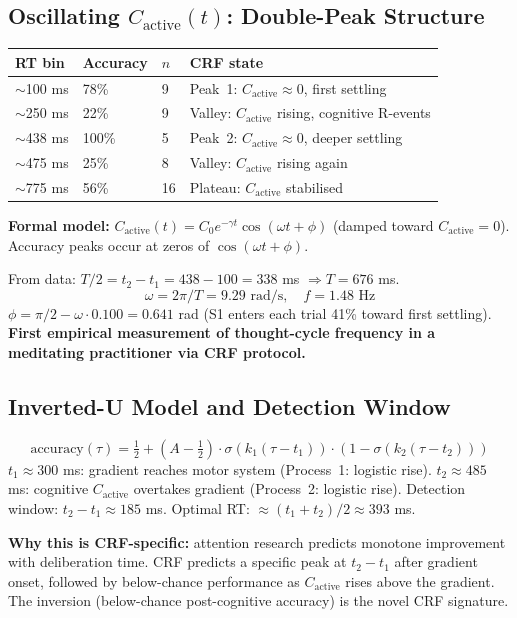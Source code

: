 \documentclass[12pt, a4paper]{article}
\begin{document}
\subsection{Oscillating $C_{\mathrm{active}}(t)$: Double-Peak Structure}

\begin{derivedbox}[title={S1: Double-Peak Structure Confirmed (v5 --- 80 Trials)}]
\begin{center}
\renewcommand{\arraystretch}{1.35}
\begin{tabular}{lllp{6cm}}
\toprule
\textbf{RT bin} & \textbf{Accuracy} & \textbf{$n$} & \textbf{CRF state} \\
\midrule
$\sim$100 ms & 78\% & 9 & Peak~1: $C_{\mathrm{active}} \approx 0$, first settling \\
$\sim$250 ms & 22\% & 9 & Valley: $C_{\mathrm{active}}$ rising, cognitive R-events \\
$\sim$438 ms & 100\% & 5 & Peak~2: $C_{\mathrm{active}} \approx 0$, deeper settling \\
$\sim$475 ms & 25\% & 8 & Valley: $C_{\mathrm{active}}$ rising again \\
$\sim$775 ms & 56\% & 16 & Plateau: $C_{\mathrm{active}}$ stabilised \\
\bottomrule
\end{tabular}
\end{center}

\textbf{Formal model:} $C_{\mathrm{active}}(t) = C_0 e^{-\gamma t}\cos(\omega t + \phi)$
(damped toward $C_{\mathrm{active}} = 0$). Accuracy peaks occur at zeros of $\cos(\omega t + \phi)$.

From data: $T/2 = t_2 - t_1 = 438 - 100 = 338$ ms $\Rightarrow T = 676$ ms.
\[
\omega = 2\pi/T = 9.29\text{ rad/s}, \quad f = 1.48\text{ Hz}
\]
$\phi = \pi/2 - \omega \cdot 0.100 = 0.641$ rad (S1 enters each trial 41\% toward first settling).
\textbf{First empirical measurement of thought-cycle frequency in a meditating practitioner
via CRF protocol.}
\end{derivedbox}

\subsection{Inverted-U Model and Detection Window}

\begin{derivedbox}[title={P0-H Formal Model: Two-Threshold Timing}]
\[
\mathrm{accuracy}(\tau) = \tfrac{1}{2} + \left(A - \tfrac{1}{2}\right)
\cdot \sigma(k_1(\tau - t_1)) \cdot (1 - \sigma(k_2(\tau - t_2)))
\]
$t_1 \approx 300$ ms: gradient reaches motor system (Process~1: logistic rise).
$t_2 \approx 485$ ms: cognitive $C_{\mathrm{active}}$ overtakes gradient (Process~2: logistic rise).
Detection window: $t_2 - t_1 \approx 185$ ms. Optimal RT: $\approx (t_1 + t_2)/2 \approx 393$ ms.

\textbf{Why this is CRF-specific:} attention research predicts monotone improvement with
deliberation time. CRF predicts a specific peak at $t_2 - t_1$ after gradient onset,
followed by below-chance performance as $C_{\mathrm{active}}$ rises above the gradient.
The inversion (below-chance post-cognitive accuracy) is the novel CRF signature.
\end{derivedbox}
\end{document}
